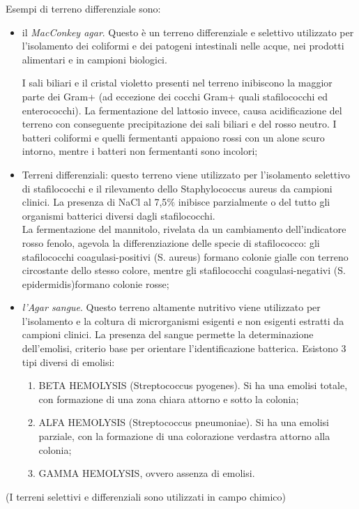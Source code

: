 \documentclass[11pt]{book}
\begin{document}
\begin{itemize}
Esempi di terreno differenziale sono:
\begin{itemize}
\item il \emph{MacConkey agar}. Questo è un terreno differenziale e selettivo utilizzato per l’isolamento dei coliformi e dei patogeni intestinali nelle acque, nei prodotti alimentari e in campioni biologici.

I sali biliari e il cristal violetto presenti nel terreno inibiscono la maggior parte dei Gram+ (ad eccezione dei cocchi Gram+ quali stafilococchi ed enterococchi). La fermentazione del lattosio invece, causa
acidificazione del terreno con conseguente precipitazione dei sali biliari e del rosso neutro. I batteri coliformi e quelli fermentanti appaiono rossi con un alone scuro intorno, mentre i batteri non fermentanti sono incolori;
\item Terreni differenziali: questo terreno viene utilizzato per l'isolamento selettivo di stafilococchi e il rilevamento dello Staphylococcus aureus da campioni clinici. La presenza di NaCl al 7,5$\%$ inibisce parzialmente o del tutto gli organismi batterici diversi dagli stafilococchi.\\
La fermentazione del mannitolo, rivelata da un cambiamento dell'indicatore rosso fenolo, agevola la differenziazione delle specie di stafilococco: gli stafilococchi coagulasi-positivi (S. aureus) formano colonie gialle con terreno circostante dello stesso colore, mentre gli stafilococchi coagulasi-negativi (S. epidermidis)formano colonie rosse;
\item \emph{l'Agar sangue}. Questo terreno altamente nutritivo viene utilizzato per l'isolamento e la coltura di microrganismi esigenti e non esigenti estratti da campioni clinici. La presenza del sangue permette la determinazione dell’emolisi, criterio base per orientare l’identificazione batterica. Esistono 3 tipi diversi di emolisi:
\begin{enumerate}
\item BETA HEMOLYSIS (Streptococcus pyogenes). Si ha una emolisi totale, con formazione di una zona chiara attorno e sotto la colonia;
\item ALFA HEMOLYSIS (Streptococcus pneumoniae). Si ha una emolisi parziale, con la formazione di una colorazione verdastra attorno alla colonia;
\item GAMMA HEMOLYSIS, ovvero assenza di emolisi.
\end{enumerate}
\end{itemize}

(I terreni selettivi e differenziali sono utilizzati in campo chimico)
\end{itemize}
\end{document}
